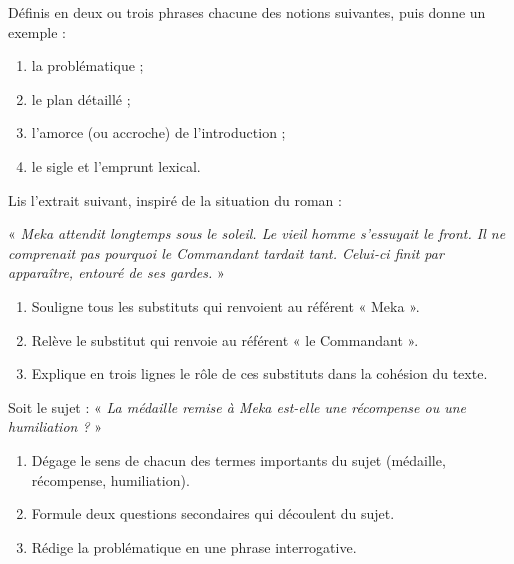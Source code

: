 \documentclass[11pt]{article}
\newcounter{popsec}
\newcounter{popsub}
\newcommand{\courssub}[1]{%
  \stepcounter{popsub}%
  \par\vspace{9pt}\noindent{\popxbold\fontsize{11.5}{13}\selectfont\color{popink}{\color{poporange}\thepopsec.\thepopsub}\hspace{6pt}#1}\par\nopagebreak\vspace{4pt}
}
\begin{document}
\begin{exercice}[Définitions]
Définis en deux ou trois phrases chacune des notions suivantes, puis donne un exemple :
\begin{enumerate}
\item la problématique ;
\item le plan détaillé ;
\item l'amorce (ou accroche) de l'introduction ;
\item le sigle et l'emprunt lexical.
\end{enumerate}
\end{exercice}

\begin{exercice}
Lis l'extrait suivant, inspiré de la situation du roman :

« \emph{Meka attendit longtemps sous le soleil. Le vieil homme s'essuyait le front. Il ne comprenait pas pourquoi le Commandant tardait tant. Celui-ci finit par apparaître, entouré de ses gardes.} »

\begin{enumerate}
\item Souligne tous les substituts qui renvoient au référent « Meka ».
\item Relève le substitut qui renvoie au référent « le Commandant ».
\item Explique en trois lignes le rôle de ces substituts dans la cohésion du texte.
\end{enumerate}
\end{exercice}

\courssub{Je m'entraîne}

\begin{exercice}
Soit le sujet : « \emph{La médaille remise à Meka est-elle une récompense ou une humiliation ?} »

\begin{enumerate}
\item Dégage le sens de chacun des termes importants du sujet (médaille, récompense, humiliation).
\item Formule deux questions secondaires qui découlent du sujet.
\item Rédige la problématique en une phrase interrogative.
\end{enumerate}
\end{exercice}
\end{document}
